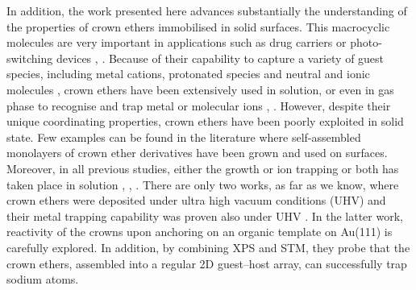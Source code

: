 \documentclass[aps,prl,reprint,longbibliography,superscriptaddress, english]{revtex4-1}
\begin{document}
In addition, the work presented here advances substantially the understanding of the properties of crown ethers immobilised in solid surfaces. 
This macrocyclic molecules are very important in applications such as drug carriers \cite{uchegbu_non-ionic_1998} or photo-switching devices \cite{malval_photoswitching_2002}, \cite{uda_membrane_2005}. Because of their capability to capture a variety of guest species, including metal cations, protonated species and neutral and ionic molecules \cite{dobler1981ionophores}, crown ethers \cite{gokel_crown_1991} have been extensively used in solution, or even in gas phase to recognise and trap metal or molecular ions \cite{more_intrinsic_1999}, \cite{maleknia_cavity-size-dependent_2002}. However, despite their unique coordinating properties, crown ethers have been poorly exploited in solid state. Few examples can be found in the literature where self-assembled monolayers of crown ether derivatives have been grown and used on surfaces. Moreover, in all previous studies, either the growth or ion trapping or both has taken place in solution \cite{yoshimoto_hostguest_2003}, \cite{flink_recognition_1999}, \cite{inokuchi_new_2015}. 
 There are only two works, as far as we know, where crown ethers were deposited under ultra high vacuum conditions (UHV) \cite{feng_growth_2018} and their metal trapping capability was proven also under UHV \cite{stredansky_-surface_2019}. In the latter work, reactivity of the crowns upon anchoring on an organic template on Au(111) is carefully explored. In addition, by combining XPS and STM, they probe that the crown ethers, assembled into a regular 2D guest--host array, can successfully trap sodium atoms.

\end{document}
